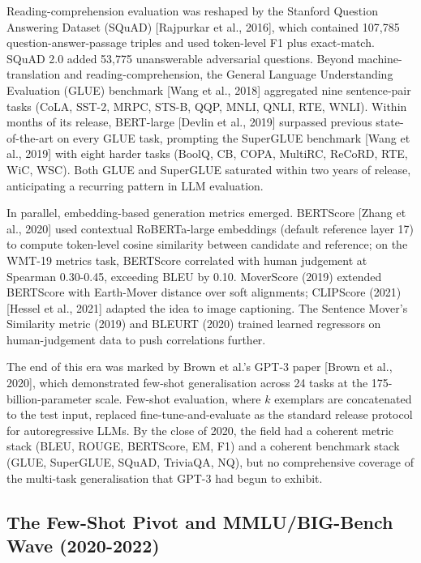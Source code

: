 Reading-comprehension evaluation was reshaped by the Stanford Question Answering Dataset (SQuAD) {[}Rajpurkar et al., 2016{]}, which contained 107,785 question-answer-passage triples and used token-level F1 plus exact-match. SQuAD 2.0 added 53,775 unanswerable adversarial questions. Beyond machine-translation and reading-comprehension, the General Language Understanding Evaluation (GLUE) benchmark {[}Wang et al., 2018{]} aggregated nine sentence-pair tasks (CoLA, SST-2, MRPC, STS-B, QQP, MNLI, QNLI, RTE, WNLI). Within months of its release, BERT-large {[}Devlin et al., 2019{]} surpassed previous state-of-the-art on every GLUE task, prompting the SuperGLUE benchmark {[}Wang et al., 2019{]} with eight harder tasks (BoolQ, CB, COPA, MultiRC, ReCoRD, RTE, WiC, WSC). Both GLUE and SuperGLUE saturated within two years of release, anticipating a recurring pattern in LLM evaluation.

In parallel, embedding-based generation metrics emerged. BERTScore {[}Zhang et al., 2020{]} used contextual RoBERTa-large embeddings (default reference layer 17) to compute token-level cosine similarity between candidate and reference; on the WMT-19 metrics task, BERTScore correlated with human judgement at Spearman 0.30-0.45, exceeding BLEU by 0.10. MoverScore (2019) extended BERTScore with Earth-Mover distance over soft alignments; CLIPScore (2021) {[}Hessel et al., 2021{]} adapted the idea to image captioning. The Sentence Mover's Similarity metric (2019) and BLEURT (2020) trained learned regressors on human-judgement data to push correlations further.

The end of this era was marked by Brown et al.'s GPT-3 paper {[}Brown et al., 2020{]}, which demonstrated few-shot generalisation across 24 tasks at the 175-billion-parameter scale. Few-shot evaluation, where \(k\) exemplars are concatenated to the test input, replaced fine-tune-and-evaluate as the standard release protocol for autoregressive LLMs. By the close of 2020, the field had a coherent metric stack (BLEU, ROUGE, BERTScore, EM, F1) and a coherent benchmark stack (GLUE, SuperGLUE, SQuAD, TriviaQA, NQ), but no comprehensive coverage of the multi-task generalisation that GPT-3 had begun to exhibit.

\subsection{The Few-Shot Pivot and MMLU/BIG-Bench Wave (2020-2022)}\label{the-few-shot-pivot-and-mmlubig-bench-wave-2020-2022}

